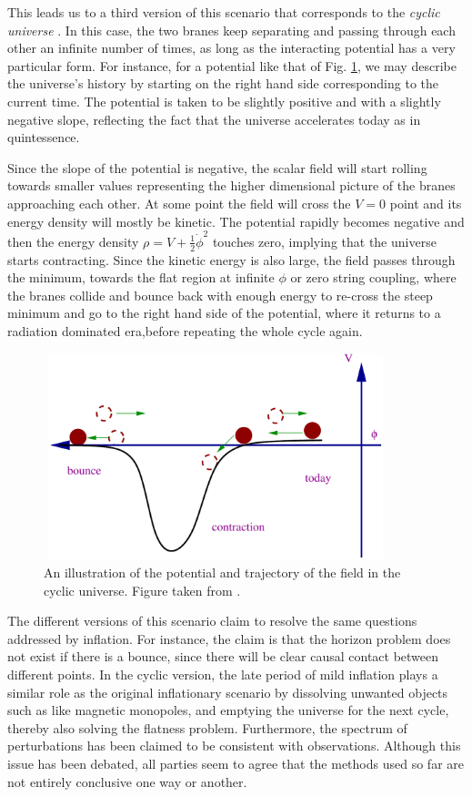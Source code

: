 This leads us to a third version of this scenario that corresponds
 to the {\it cyclic universe} \cite{Steinhardt:2002ih}. In this case, the two branes keep separating and
 passing through each other an infinite number of 
times, as long as the interacting 
potential has a very particular form. For instance, for a potential like that of
 Fig. \ref{Fig:cyclic}, we may describe the universe's history by starting on the right
 hand side corresponding to the current time. The potential is taken to be slightly positive 
and with a slightly negative slope, reflecting the fact that the universe accelerates today as in quintessence.

 Since the slope of the potential is  negative, the scalar field
will start rolling towards smaller values representing the higher dimensional picture of the branes approaching each other.
At some point the field will cross the $V=0$ point and its energy density
 will mostly be kinetic. The potential rapidly becomes negative
 and then the energy density $\rho= V+\frac{1}{2}\dot\phi^2$ touches zero, implying 
that the universe starts contracting. Since the kinetic energy is also 
large, the 
field  passes through the minimum, towards the flat region at infinite
$\phi$ or zero string coupling, where the branes collide
and bounce back with enough energy to re-cross the steep minimum and
go to the right hand side of the 
potential, where it returns to a radiation dominated era,before repeating the
whole cycle again.
\begin{figure}[t]
\begin{center}
\includegraphics[width=100mm,height=60mm]{Sections/Figures/cyclic2.pdf} 
\caption{An illustration of the potential and
 trajectory of the field in the cyclic universe. Figure taken from  \cite{Quevedo:2002xw}. } \label{Fig:cyclic} 
\end{center}
\end{figure}

The different versions of this scenario claim to resolve the same questions addressed by inflation. 
For instance, the claim is that the horizon problem does not exist if there is a bounce, since there will be
 clear causal contact between different points. In the cyclic version,
the late period of mild inflation plays a similar role as the
original inflationary scenario by dissolving unwanted objects such as 
like magnetic monopoles, and emptying the universe for the next cycle, thereby also solving the
flatness problem.
 Furthermore, the spectrum of perturbations has been claimed to be 
consistent with observations. Although this issue has been debated, 
all parties seem to agree that the methods used so far are not entirely
conclusive one way or another.

